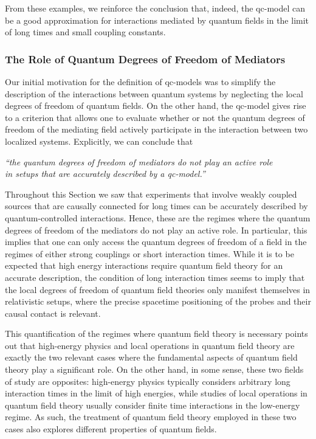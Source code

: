 \documentclass[letterpaper,12pt,titlepage,oneside,final]{book}
\begin{document}
From these examples, we reinforce the conclusion that, indeed, the qc-model can be a good approximation for interactions mediated by quantum fields in the limit of long times and small coupling constants.


\subsubsection*{The Role of Quantum Degrees of Freedom of Mediators}

Our initial motivation for the definition of qc-models was to simplify the description of the interactions between quantum systems by neglecting the local degrees of freedom of quantum fields. On the other hand, the qc-model gives rise to a criterion that allows one to evaluate whether or not the quantum degrees of freedom of the mediating field actively participate in the interaction between two localized systems. Explicitly, we can conclude that

\begin{center}
    \textit{``the quantum degrees of freedom of mediators do not play an active role \\in setups that are accurately described by a qc-model.''}
\end{center}

Throughout this Section we saw that experiments that involve weakly coupled sources that are causally connected for long times can be accurately described by quantum-controlled interactions. Hence, these are the regimes where the quantum degrees of freedom of the mediators do not play an active role. In particular, this implies that one can only access the quantum degrees of freedom of a field in the regimes of either strong couplings or short interaction times. While it is to be expected that high energy interactions require quantum field theory for an accurate description, the condition of long interaction times seems to imply that the local degrees of freedom of quantum field theories only manifest themselves in relativistic setups, where the precise spacetime positioning of the probes and their causal contact is relevant.

This quantification of the regimes where quantum field theory is necessary points out that high-energy physics and local operations in quantum field theory are exactly the two relevant cases where the fundamental aspects of quantum field theory play a significant role. On the other hand, in some sense, these two fields of study are opposites: high-energy physics typically considers arbitrary long interaction times in the limit of high energies, while studies of local operations in quantum field theory usually consider finite time interactions in the low-energy regime. As such, the treatment of quantum field theory employed in these two cases also explores different properties of quantum fields.
\end{document}
